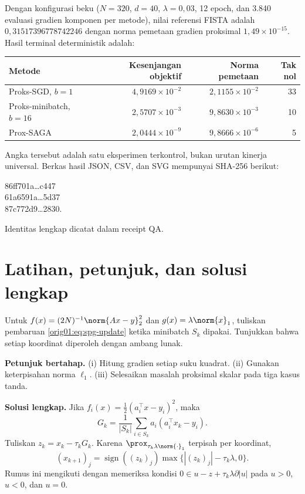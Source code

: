 Dengan konfigurasi beku ($N=320$, $d=40$, $\lambda=0{,}03$, 12 epoch, dan
3.840 evaluasi gradien komponen per metode), nilai referensi FISTA adalah
$0{,}31517396778742246$ dengan norma pemetaan gradien proksimal
$1{,}49\times10^{-15}$. Hasil terminal deterministik adalah:
\begin{center}
\begin{tabular}{lrrr}
\hline
Metode & Kesenjangan objektif & Norma pemetaan & Tak nol\\
\hline
Proks-SGD, $b=1$ & $4{,}9169\times10^{-2}$ & $2{,}1155\times10^{-2}$ & 33\\
Proks-minibatch, $b=16$ & $2{,}5707\times10^{-3}$ & $9{,}8630\times10^{-3}$ & 10\\
Prox-SAGA & $2{,}0444\times10^{-9}$ & $9{,}8666\times10^{-6}$ & 5\\
\hline
\end{tabular}
\end{center}
Angka tersebut adalah satu eksperimen terkontrol, bukan urutan kinerja
universal. Berkas hasil JSON, CSV, dan SVG mempunyai SHA-256 berikut:
\begin{center}\small\ttfamily
86ff701a\ldots c447\\
61a6591a\ldots 5d37\\
87c772d9\ldots 2830.
\end{center}
Identitas lengkap dicatat dalam receipt QA.

\section{Latihan, petunjuk, dan solusi lengkap}
\label{orig01:section:exercises}

\begin{exercise}
  \label{orig01:exercise:lasso-prox}
  Untuk $f(x)=(2N)^{-1}\norm{Ax-y}_2^2$ dan
  $g(x)=\lambda\norm{x}_1$, tuliskan pembaruan
  \eqref{orig01:eq:spg-update} ketika minibatch $S_k$ dipakai. Tunjukkan
  bahwa setiap koordinat diperoleh dengan ambang lunak.

  \textbf{Petunjuk bertahap.}
  (i) Hitung gradien setiap suku kuadrat.
  (ii) Gunakan keterpisahan norma $\ell_1$.
  (iii) Selesaikan masalah proksimal skalar pada tiga kasus tanda.

  \textbf{Solusi lengkap.}
  Jika $f_i(x)=\tfrac12(a_i^\top x-y_i)^2$, maka
  \begin{equation}
    G_k=\frac1{|S_k|}\sum_{i\in S_k}a_i(a_i^\top x_k-y_i).
  \end{equation}
  Tuliskan $z_k=x_k-\tau_kG_k$. Karena
  $\prox_{\tau_k\lambda\norm{\cdot}_1}$ terpisah per koordinat,
  \begin{equation}
    (x_{k+1})_j
    =\operatorname{sign}((z_k)_j)
      \max\{|(z_k)_j|-\tau_k\lambda,0\}.
  \end{equation}
  Rumus ini mengikuti dengan memeriksa kondisi
  $0\in u-z+\tau_k\lambda\partial|u|$ pada $u>0$, $u<0$, dan $u=0$.
\end{exercise}

